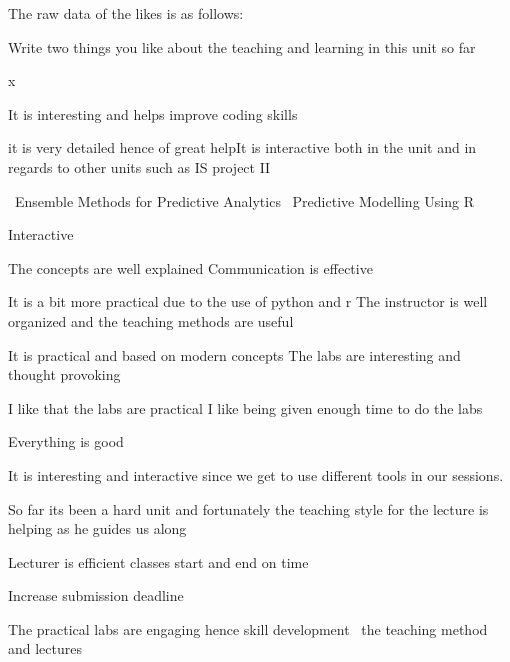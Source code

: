 \documentclass[
]{article}
\begin{document}
The raw data of the likes is as follows:

Write two things you like about the teaching and learning in this unit
so far

x

It is interesting and helps improve coding skills

it is very detailed hence of great helpIt is interactive both in the
unit and in regards to other units such as IS project II

~Ensemble Methods for Predictive Analytics~ Predictive Modelling Using
R~

Interactive

The concepts are well explained Communication is effective~

It is a bit more practical due to the use of python and r The instructor
is well organized and the teaching methods are useful

It is practical and based on modern concepts The labs are interesting
and thought provoking

I like that the labs are practical I like being given enough time to do
the labs

Everything is good

It is interesting and interactive since we get to use different tools in
our sessions.

So far its been a hard unit and fortunately the teaching style for the
lecture is helping as he guides us along~

Lecturer is efficient classes start and end on time

Increase submission deadline~

The practical labs are engaging hence skill development~ the teaching
method and lectures~
\end{document}
